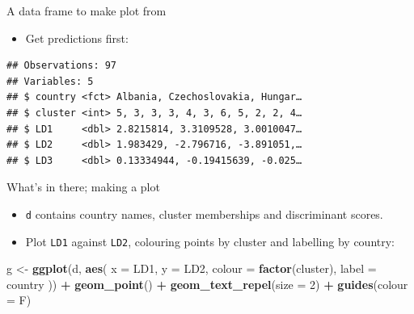 \documentclass[ignorenonframetext,]{beamer}
\newenvironment{Shaded}{\begin{snugshade}}{\end{snugshade}}
\newcommand{\DataTypeTok}[1]{\textcolor[rgb]{0.13,0.29,0.53}{#1}}
\newcommand{\DecValTok}[1]{\textcolor[rgb]{0.00,0.00,0.81}{#1}}
\newcommand{\KeywordTok}[1]{\textcolor[rgb]{0.13,0.29,0.53}{\textbf{#1}}}
\newcommand{\NormalTok}[1]{#1}
\newcommand{\OperatorTok}[1]{\textcolor[rgb]{0.81,0.36,0.00}{\textbf{#1}}}
\newcommand{\StringTok}[1]{\textcolor[rgb]{0.31,0.60,0.02}{#1}}
\providecommand{\tightlist}{%
  \setlength{\itemsep}{0pt}\setlength{\parskip}{0pt}}
\begin{document}
\begin{frame}[fragile]{A data frame to make plot from}
\protect\hypertarget{a-data-frame-to-make-plot-from}{}

\begin{itemize}
\tightlist
\item
  Get predictions first:
\end{itemize}

\small

\begin{Shaded}
\end{Shaded}

\begin{verbatim}
## Observations: 97
## Variables: 5
## $ country <fct> Albania, Czechoslovakia, Hungar…
## $ cluster <int> 5, 3, 3, 3, 4, 3, 6, 5, 2, 2, 4…
## $ LD1     <dbl> 2.8215814, 3.3109528, 3.0010047…
## $ LD2     <dbl> 1.983429, -2.796716, -3.891051,…
## $ LD3     <dbl> 0.13334944, -0.19415639, -0.025…
\end{verbatim}

\normalsize

\end{frame}

\begin{frame}[fragile]{What's in there; making a plot}
\protect\hypertarget{whats-in-there-making-a-plot}{}

\begin{itemize}
\tightlist
\item
  \texttt{d} contains country names, cluster memberships and
  discriminant scores.
\item
  Plot \texttt{LD1} against \texttt{LD2}, colouring points by cluster
  and labelling by country:
\end{itemize}

\begin{Shaded}
\begin{Highlighting}[]
\NormalTok{g <-}\StringTok{ }\KeywordTok{ggplot}\NormalTok{(d, }\KeywordTok{aes}\NormalTok{(}
  \DataTypeTok{x =}\NormalTok{ LD1, }\DataTypeTok{y =}\NormalTok{ LD2, }\DataTypeTok{colour =} \KeywordTok{factor}\NormalTok{(cluster),}
  \DataTypeTok{label =}\NormalTok{ country}
\NormalTok{)) }\OperatorTok{+}\StringTok{ }\KeywordTok{geom_point}\NormalTok{() }\OperatorTok{+}
\StringTok{  }\KeywordTok{geom_text_repel}\NormalTok{(}\DataTypeTok{size =} \DecValTok{2}\NormalTok{) }\OperatorTok{+}\StringTok{ }\KeywordTok{guides}\NormalTok{(}\DataTypeTok{colour =}\NormalTok{ F)}
\end{Highlighting}
\end{Shaded}

\end{frame}
\end{document}
